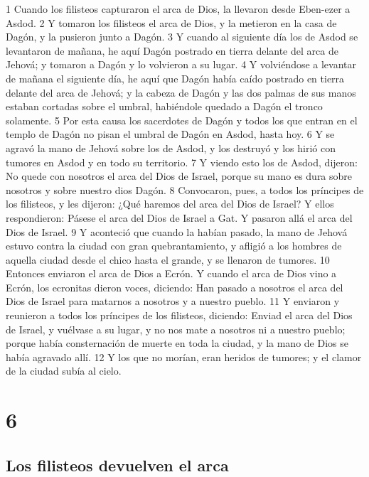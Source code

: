1 Cuando los filisteos capturaron el arca de Dios, la llevaron desde Eben-ezer a Asdod.
2 Y tomaron los filisteos el arca de Dios, y la metieron en la casa de Dagón, y la pusieron junto a Dagón.
3 Y cuando al siguiente día los de Asdod se levantaron de mañana, he aquí Dagón postrado en tierra delante del arca de Jehová; y tomaron a Dagón y lo volvieron a su lugar.
4 Y volviéndose a levantar de mañana el siguiente día, he aquí que Dagón había caído postrado en tierra delante del arca de Jehová; y la cabeza de Dagón y las dos palmas de sus manos estaban cortadas sobre el umbral, habiéndole quedado a Dagón el tronco solamente.
5 Por esta causa los sacerdotes de Dagón y todos los que entran en el templo de Dagón no pisan el umbral de Dagón en Asdod, hasta hoy.
6 Y se agravó la mano de Jehová sobre los de Asdod, y los destruyó y los hirió con tumores en Asdod y en todo su territorio.
7 Y viendo esto los de Asdod, dijeron: No quede con nosotros el arca del Dios de Israel, porque su mano es dura sobre nosotros y sobre nuestro dios Dagón.
8 Convocaron, pues, a todos los príncipes de los filisteos, y les dijeron: ¿Qué haremos del arca del Dios de Israel? Y ellos respondieron: Pásese el arca del Dios de Israel a Gat. Y pasaron allá el arca del Dios de Israel.
9 Y aconteció que cuando la habían pasado, la mano de Jehová estuvo contra la ciudad con gran quebrantamiento, y afligió a los hombres de aquella ciudad desde el chico hasta el grande, y se llenaron de tumores.
10 Entonces enviaron el arca de Dios a Ecrón. Y cuando el arca de Dios vino a Ecrón, los ecronitas dieron voces, diciendo: Han pasado a nosotros el arca del Dios de Israel para matarnos a nosotros y a nuestro pueblo.
11 Y enviaron y reunieron a todos los príncipes de los filisteos, diciendo: Enviad el arca del Dios de Israel, y vuélvase a su lugar, y no nos mate a nosotros ni a nuestro pueblo; porque había consternación de muerte en toda la ciudad, y la mano de Dios se había agravado allí.
12 Y los que no morían, eran heridos de tumores; y el clamor de la ciudad subía al cielo.

\chapter{6}

\section*{Los filisteos devuelven el arca}

